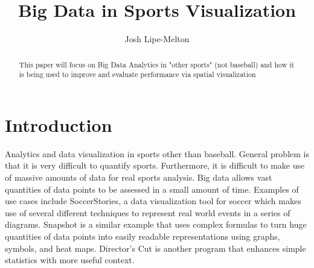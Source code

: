 \documentclass[sigconf]{acmart}
\begin{document}
\title{Big Data in Sports Visualization}


\author{Josh Lipe-Melton}

\renewcommand{\shortauthors}{J. Lipe-Melton}


\begin{abstract}
This paper will focus on Big Data Analytics in "other sports" (not baseball) and how it is being used to improve and evaluate performance via spatial visualization
\end{abstract}



\maketitle




\section{Introduction} Analytics and data visualization in sports other than baseball. General problem is that it is very difficult to quantify sports. Furthermore, it is difficult to make use of massive amounts of data for real sports analysis. Big data allows vast quantities of data points to be assessed in a small amount of time. Examples of use cases include SoccerStories, a data visualization tool for soccer which makes use of several different techniques to represent real world events in a series of diagrams. Snapshot is a similar example that uses complex formulas to turn huge quantities of data points into easily readable representations using graphs, symbols, and heat maps. Director’s Cut is another program that enhances simple statistics with more useful context.
\end{document}
